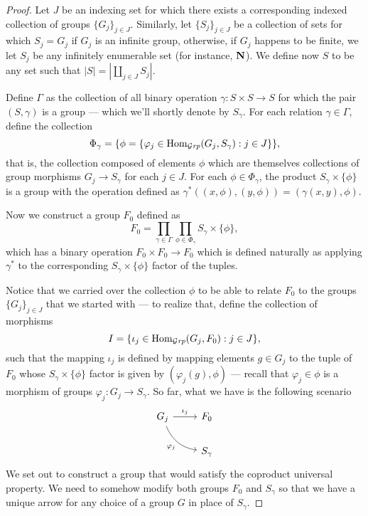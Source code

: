 \begin{proof}
Let \(J\) be an indexing set for which there exists a corresponding indexed
collection of groups \(\{G_{j}\}_{j \in J}\). Similarly, let \(\{S_{j}\}_{j \in J}\)
be a collection of sets for which \(S_j = G_j\) if \(G_j\) is an infinite group,
otherwise, if \(G_j\) happens to be finite, we let \(S_j\) be any infinitely
enumerable set (for instance, \(\mathbf{N}\)). We define now \(S\) to be any set such
that \(|S| = |\coprod_{j \in J} S_{j}|\).

Define \(\Gamma\) as the collection of all binary operation \(\gamma: S \times S \to S\) for
which the pair \((S, \gamma)\) is a group --- which we'll shortly denote by
\(S_{\gamma}\). For each relation \(\gamma \in \Gamma\), define the collection
\[
  \Phi_{\gamma} = \{\phi = \{\varphi_{j} \in \operatorname{Hom}_{{\mathcal{G}\textit{rp}}}(G_j, S_\gamma) : j \in J\}\},
\]
that is, the collection composed of elements \(\phi\) which are themselves
collections of group morphisms \(G_j \to S_\gamma\) for each \(j \in J\). For each \(\phi \in
\Phi_{\gamma}\), the product \(S_{\gamma} \times \{\phi\}\) is a group with the operation defined as
\(\gamma^{*}((x, \phi), (y, \phi)) = (\gamma(x, y), \phi)\).

Now we construct a group \(F_0\) defined as
\[
  F_0 = \prod_{\gamma \in \Gamma} \prod_{\phi \in \Phi_{\gamma}} S_{\gamma} \times \{\phi\},
\]
which has a binary operation \(F_0 \times F_0 \to F_0\) which is defined naturally as
applying \(\gamma^{*}\) to the corresponding \(S_{\gamma} \times \{\phi\}\) factor of the
tuples.

Notice that we carried over the collection \(\phi\) to be able to relate \(F_0\) to
the groups \(\{G_{j}\}_{j \in J}\) that we started with --- to realize that, define
the collection of morphisms
\[
  I = \{\iota_{j} \in \operatorname{Hom}_{{\mathcal{G}\textit{rp}}}(G_j, F_0) : j \in J\},
\]
such that the mapping \(\iota_j\) is defined by mapping elements \(g \in G_j\) to the
tuple of \(F_0\) whose \(S_{\gamma} \times \{\phi\}\) factor is given by \((\varphi_j(g), \phi)\) ---
recall that \(\varphi_j \in \phi\) is a morphism of groups \(\varphi_j: G_j \to S_{\gamma}\). So far,
what we have is the following scenario
\[
  \begin{tikzcd}
    G_j \ar[r, "\iota_j"] \ar[rd, bend right, swap, "\varphi_j"] &F_0 \\ &S_\gamma
  \end{tikzcd}
\]
We set out to construct a group that would satisfy the coproduct universal
property. We need to somehow modify both groups \(F_0\) and \(S_{\gamma}\) so that we
have a unique arrow for any choice of a group \(G\) in place of \(S_{\gamma}\).


\end{proof}
